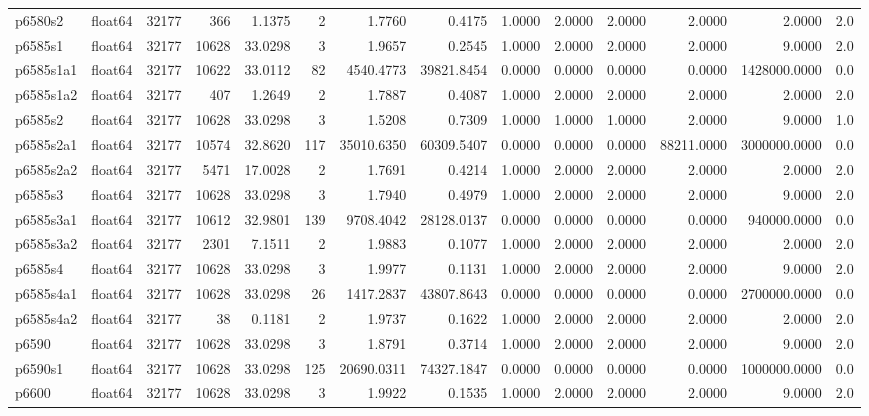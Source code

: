 \begin{longtable}{llrrrrrrrrrrrl}
p6580s2 & float64 & 32177 & 366 & 1.1375 & 2 & 1.7760 & 0.4175 & 1.0000 & 2.0000 & 2.0000 & 2.0000 & 2.0000 & 2.0 \\
p6585s1 & float64 & 32177 & 10628 & 33.0298 & 3 & 1.9657 & 0.2545 & 1.0000 & 2.0000 & 2.0000 & 2.0000 & 9.0000 & 2.0 \\
p6585s1a1 & float64 & 32177 & 10622 & 33.0112 & 82 & 4540.4773 & 39821.8454 & 0.0000 & 0.0000 & 0.0000 & 0.0000 & 1428000.0000 & 0.0 \\
p6585s1a2 & float64 & 32177 & 407 & 1.2649 & 2 & 1.7887 & 0.4087 & 1.0000 & 2.0000 & 2.0000 & 2.0000 & 2.0000 & 2.0 \\
p6585s2 & float64 & 32177 & 10628 & 33.0298 & 3 & 1.5208 & 0.7309 & 1.0000 & 1.0000 & 1.0000 & 2.0000 & 9.0000 & 1.0 \\
p6585s2a1 & float64 & 32177 & 10574 & 32.8620 & 117 & 35010.6350 & 60309.5407 & 0.0000 & 0.0000 & 0.0000 & 88211.0000 & 3000000.0000 & 0.0 \\
p6585s2a2 & float64 & 32177 & 5471 & 17.0028 & 2 & 1.7691 & 0.4214 & 1.0000 & 2.0000 & 2.0000 & 2.0000 & 2.0000 & 2.0 \\
p6585s3 & float64 & 32177 & 10628 & 33.0298 & 3 & 1.7940 & 0.4979 & 1.0000 & 2.0000 & 2.0000 & 2.0000 & 9.0000 & 2.0 \\
p6585s3a1 & float64 & 32177 & 10612 & 32.9801 & 139 & 9708.4042 & 28128.0137 & 0.0000 & 0.0000 & 0.0000 & 0.0000 & 940000.0000 & 0.0 \\
p6585s3a2 & float64 & 32177 & 2301 & 7.1511 & 2 & 1.9883 & 0.1077 & 1.0000 & 2.0000 & 2.0000 & 2.0000 & 2.0000 & 2.0 \\
p6585s4 & float64 & 32177 & 10628 & 33.0298 & 3 & 1.9977 & 0.1131 & 1.0000 & 2.0000 & 2.0000 & 2.0000 & 9.0000 & 2.0 \\
p6585s4a1 & float64 & 32177 & 10628 & 33.0298 & 26 & 1417.2837 & 43807.8643 & 0.0000 & 0.0000 & 0.0000 & 0.0000 & 2700000.0000 & 0.0 \\
p6585s4a2 & float64 & 32177 & 38 & 0.1181 & 2 & 1.9737 & 0.1622 & 1.0000 & 2.0000 & 2.0000 & 2.0000 & 2.0000 & 2.0 \\
p6590 & float64 & 32177 & 10628 & 33.0298 & 3 & 1.8791 & 0.3714 & 1.0000 & 2.0000 & 2.0000 & 2.0000 & 9.0000 & 2.0 \\
p6590s1 & float64 & 32177 & 10628 & 33.0298 & 125 & 20690.0311 & 74327.1847 & 0.0000 & 0.0000 & 0.0000 & 0.0000 & 1000000.0000 & 0.0 \\
p6600 & float64 & 32177 & 10628 & 33.0298 & 3 & 1.9922 & 0.1535 & 1.0000 & 2.0000 & 2.0000 & 2.0000 & 9.0000 & 2.0 \\

\end{longtable}

